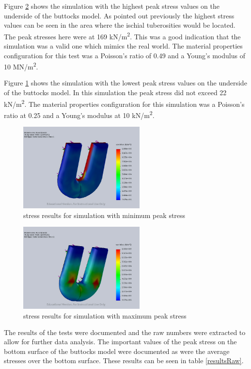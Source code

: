 \documentclass[conference]{IEEEtran}
\begin{document}
Figure \ref{maxstress} shows the simulation with the highest peak stress values on the underside of the buttocks model. As pointed out previously the highest stress values can be seen in the area where the ischial tuberosities would be located. The peak stresses here were at 169 kN/m\textsuperscript{2}. This was a good indication that the simulation was a valid one which mimics the real world. The material properties configuration for this test was a Poisson's ratio of 0.49 and a Young's modulus of 10 MN/m\textsuperscript{2}.

Figure \ref{stress} shows the simulation with the lowest peak stress values on the underside of the buttocks model. In this simulation the peak stress did not exceed 22 kN/m\textsuperscript{2}. The material properties configuration for this simulation was a Poisson's ratio at 0.25 and a Young's modulus at 10 kN/m\textsuperscript{2}.

\begin{figure}[!t]
\centering
 \includegraphics[width=2.5in]{pics/ButtocksPressure.jpg}
    \caption{stress results for simulation with minimum peak stress}
    \label{stress}
\end{figure}

\begin{figure}[!t]
\centering
 \includegraphics[width=2.5in]{pics/buttocksPressureMax.jpg}
    \caption{stress results for simulation with maximum peak stress}
    \label{maxstress}
\end{figure}

The results of the tests were documented and the raw numbers were extracted to allow for further data analysis. The important values of the peak stress on the bottom surface of the buttocks model were documented as were the average stresses over the bottom surface. These results can be seen in table \ref{resultsRaw}.
\end{document}

